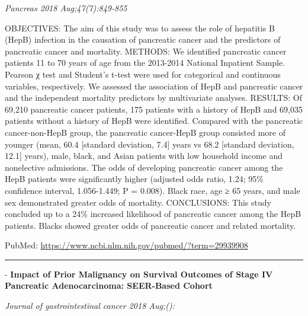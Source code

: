 \documentclass[]{article}
\begin{document}
\emph{Pancreas 2018 Aug;47(7):849-855}

OBJECTIVES: The aim of this study was to assess the role of hepatitis B
(HepB) infection in the causation of pancreatic cancer and the
predictors of pancreatic cancer and mortality. METHODS: We identified
pancreatic cancer patients 11 to 70 years of age from the 2013-2014
National Inpatient Sample. Pearson χ test and Student's t-test were used
for categorical and continuous variables, respectively. We assessed the
association of HepB and pancreatic cancer and the independent mortality
predictors by multivariate analyses. RESULTS: Of 69,210 pancreatic
cancer patients, 175 patients with a history of HepB and 69,035 patients
without a history of HepB were identified. Compared with the pancreatic
cancer-non-HepB group, the pancreatic cancer-HepB group consisted more
of younger (mean, 60.4 {[}standard deviation, 7.4{]} years vs 68.2
{[}standard deviation, 12.1{]} years), male, black, and Asian patients
with low household income and nonelective admissions. The odds of
developing pancreatic cancer among the HepB patients were significantly
higher (adjusted odds ratio, 1.24; 95\% confidence interval,
1.056-1.449; P = 0.008). Black race, age ≥ 65 years, and male sex
demonstrated greater odds of mortality. CONCLUSIONS: This study
concluded up to a 24\% increased likelihood of pancreatic cancer among
the HepB patients. Blacks showed greater odds of pancreatic cancer and
related mortality.

PubMed: \url{https://www.ncbi.nlm.nih.gov/pubmed/?term=29939908}

{}

{}

\begin{center}\rule{0.5\linewidth}{\linethickness}\end{center}

 - \textbf{Impact of Prior Malignancy on Survival Outcomes of Stage IV
Pancreatic Adenocarcinoma: SEER-Based Cohort}

\emph{Journal of gastrointestinal cancer 2018 Aug;():}
\end{document}
